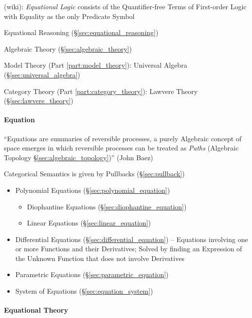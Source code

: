 (wiki): \emph{Equational Logic} consists of the Quantifier-free Terms of
First-order Logic with Equality as the only Predicate Symbol

Equational Reasoning (\S\ref{sec:equational_reasoning})

Algebraic Theory (\S\ref{sec:algebraic_theory})

Model Theory (Part \ref{part:model_theory}): Universal Algebra
(\S\ref{sec:universal_algebra})

Category Theory (Part \ref{part:category_theory}): Lawvere Theory
(\S\ref{sec:lawvere_theory})



\paragraph{Equation}\label{sec:equation}\hfill


``Equations are summaries of reversible processes, a purely Algebraic concept of
space emerges in which reversible processes can be treated as \emph{Paths}
(Algebraic Topology \S\ref{sec:algebraic_topology})''
(John Baez)

Categorical Semantics is given by Pullbacks (\S\ref{sec:pullback})

\begin{itemize}
  \item Polynomial Equations (\S\ref{sec:polynomial_equation})
  \begin{itemize}
    \item Diophantine Equations (\S\ref{sec:diophantine_equation})
    \item Linear Equations (\S\ref{sec:linear_equation})
  \end{itemize}
  \item Differential Equations (\S\ref{sec:differential_equation}) -- Equations
    involving one or more Functions and their Derivatives; Solved by finding an
    Expression of the Unknown Function that does not involve Derivatives
  \item Parametric Equations (\S\ref{sec:parametric_equation})
  \item System of Equations (\S\ref{sec:equation_system})
\end{itemize}



\paragraph{Equational Theory}\label{sec:equational_theory}\hfill

